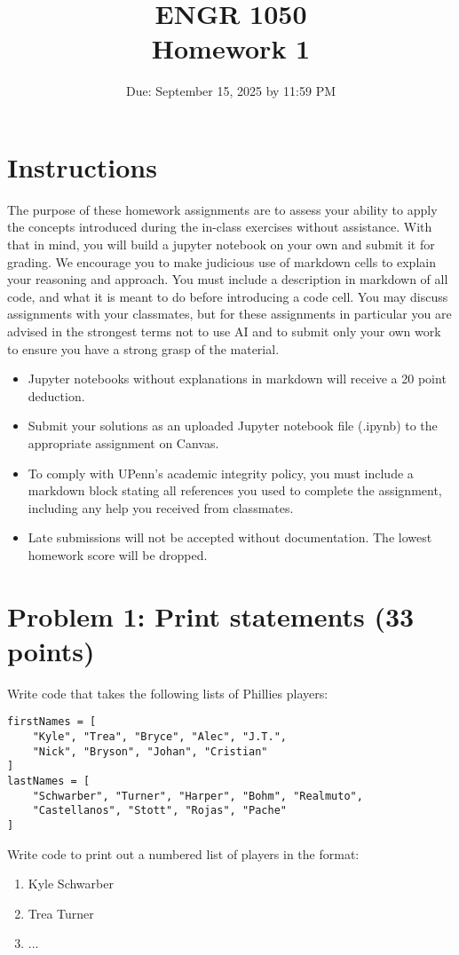 \documentclass[12pt]{article}
\title{ENGR 1050 \\ Homework 1}
\author{Due: September 15, 2025 by 11:59 PM}
\date{}
\begin{document}
\maketitle

\section*{Instructions}
The purpose of these homework assignments are to assess your ability to apply the concepts introduced during the in-class exercises without assistance. With that in mind, you will build a jupyter notebook on your own and submit it for grading. We encourage you to make judicious use of markdown cells to explain your reasoning and approach. You must include a description in markdown of all code, and what it is meant to do before introducing a code cell. You may discuss assignments with your classmates, but for these assignments in particular you are advised in the strongest terms not to use AI and to submit only your own work to ensure you have a strong grasp of the material.

\begin{itemize}
    \item Jupyter notebooks without explanations in markdown will receive a 20 point deduction.
    \item Submit your solutions as an uploaded Jupyter notebook file (.ipynb) to the appropriate assignment on Canvas.
    \item To comply with UPenn's academic integrity policy, you must include a markdown block stating all references you used to complete the assignment, including any help you received from classmates.
    \item Late submissions will not be accepted without documentation. The lowest homework score will be dropped.
\end{itemize}

\section*{Problem 1: Print statements (33 points)}
Write code that takes the following lists of Phillies players:
\begin{verbatim}
firstNames = [
    "Kyle", "Trea", "Bryce", "Alec", "J.T.",
    "Nick", "Bryson", "Johan", "Cristian"
]
lastNames = [
    "Schwarber", "Turner", "Harper", "Bohm", "Realmuto",
    "Castellanos", "Stott", "Rojas", "Pache"
]
\end{verbatim}
Write code to print out a numbered list of players in the format:
\begin{enumerate}
\item Kyle Schwarber
\item Trea Turner
\item ...
\end{enumerate}
\end{document}
